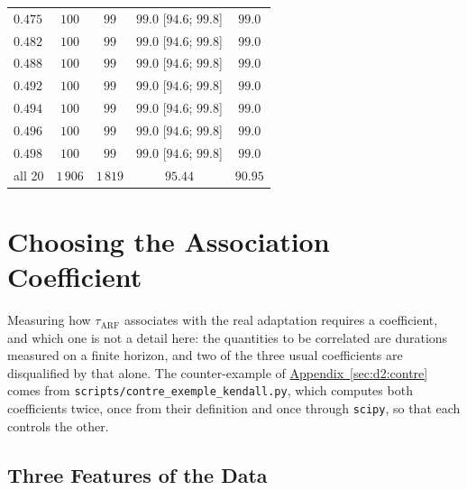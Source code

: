 \documentclass[10pt,conference]{IEEEtran}
\theoremstyle{definition}
\begin{document}
\begin{table}[t]
\begin{tabular}{lcccc}
    $0.475$ & $100$ & $99$ & $99.0$ [$94.6$; $99.8$] & $99.0$ \\
    $0.482$ & $100$ & $99$ & $99.0$ [$94.6$; $99.8$] & $99.0$ \\
    $0.488$ & $100$ & $99$ & $99.0$ [$94.6$; $99.8$] & $99.0$ \\
    $0.492$ & $100$ & $99$ & $99.0$ [$94.6$; $99.8$] & $99.0$ \\
    $0.494$ & $100$ & $99$ & $99.0$ [$94.6$; $99.8$] & $99.0$ \\
    $0.496$ & $100$ & $99$ & $99.0$ [$94.6$; $99.8$] & $99.0$ \\
    $0.498$ & $100$ & $99$ & $99.0$ [$94.6$; $99.8$] & $99.0$ \\
    \midrule
    all 20  & $1\,906$ & $1\,819$ & $95.44$ & $90.95$ \\
    \bottomrule
  \end{tabular}

\end{table}

\section{Choosing the Association Coefficient}
\label{sec:D2}

Measuring how $\tau_{\mathrm{ARF}}$ associates with the real adaptation requires a
coefficient, and which one is not a detail here: the quantities to be
correlated are durations measured on a finite horizon, and two of the three usual
coefficients are disqualified by that alone. The counter-example of
\hyperref[sec:d2:contre]{Appendix~\ref*{sec:d2:contre}} comes from \texttt{scripts/contre\_exemple\_kendall.py},
which computes both coefficients twice, once from their definition and once through
\texttt{scipy}, so that each controls the other.

\subsection{Three Features of the Data}
\label{sec:d2:features}
\end{document}
